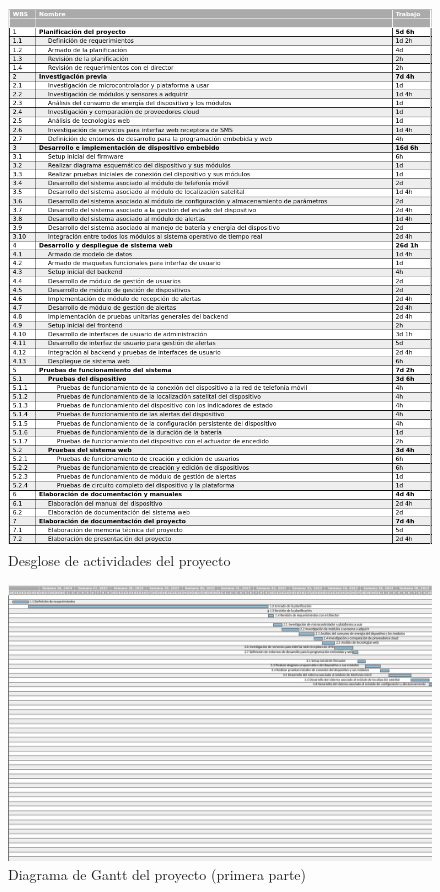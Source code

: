 \documentclass[
11pt, %
]{charter}
\begin{document}
\begin{figure}[htpb]
\centering 
\includegraphics[width=.9\textwidth]{./Figuras/WBS.png}
\caption{Desglose de actividades del proyecto}
\label{fig:diagGanttWBS}
\end{figure}

\begin{landscape}
\begin{figure}[htpb]
\centering 
\includegraphics[width=\paperwidth]{./Figuras/Gantt1.png}
\caption{Diagrama de Gantt del proyecto (primera parte)}
\label{fig:diagGantt1}
\end{figure}
\end{landscape}
\end{document}
